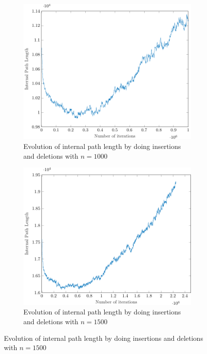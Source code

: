 \begin{figure}[ht]
    \centering
    \begin{subfigure}{0.32\textwidth}
        \centering
        \includegraphics[width=\textwidth]{IPLDelete1000.pdf}
        \caption{Evolution of internal path length by doing insertions and deletions with $n = 1000$}
    \end{subfigure}%
    \hfill
    \begin{subfigure}{0.32\textwidth}
        \centering
        \includegraphics[width=\textwidth]{IPLDelete1500.pdf}
        \caption{Evolution of internal path length by doing insertions and deletions with $n = 1500$}

\end{subfigure}
\end{figure}
